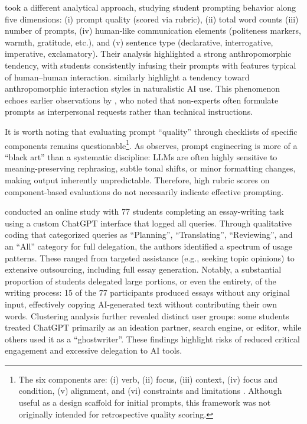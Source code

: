 \documentclass[english]{textolivre}
\begin{document}
\textcite{KNOTH2024100225} took a different analytical approach, studying student prompting behavior along five dimensions: (i) prompt quality (scored via rubric), (ii) total word counts (iii) number of prompts, (iv) human-like communication elements (politeness markers, warmth, gratitude, etc.), and (v) sentence type (declarative, interrogative, imperative, exclamatory). Their analysis highlighted a strong anthropomorphic tendency, with students consistently infusing their prompts with features typical of human--human interaction. \textcite{ammari2026studentsreallyusechatgpt} similarly highlight a tendency toward anthropomorphic interaction styles in naturalistic AI use. This phenomenon echoes earlier observations by \textcite{zamfirescu2023johnny}, who noted that non-experts often formulate prompts as interpersonal requests rather than technical instructions.

It is worth noting that evaluating prompt ``quality'' through checklists of specific components remains questionable\footnote{The six components are: (i) verb, (ii) focus, (iii) context, (iv) focus and condition, (v) alignment, and (vi) constraints and limitations \cite{Eager2023}. Although useful as a design scaffold for initial prompts, this framework was not originally intended for retrospective quality scoring.}.
As \textcite{2024schulho} observes, prompt engineering is more of a ``black art'' than a systematic discipline: LLMs are often highly sensitive to meaning-preserving rephrasing, subtle tonal shifts, or minor formatting changes, making output inherently unpredictable. Therefore, high rubric scores on component-based evaluations do not necessarily indicate effective prompting.

\textcite{jelson2025empiricalstudyunderstandstudents} conducted an online study with 77 students completing an essay-writing task using a custom ChatGPT interface that logged all queries. Through qualitative coding that categorized queries as ``Planning'', ``Translating'', ``Reviewing'', and an ``All'' category for full delegation, the authors identified a spectrum of usage patterns. These ranged from targeted assistance (e.g., seeking topic opinions) to extensive outsourcing, including full essay generation. Notably, a substantial proportion of students delegated large portions, or even the entirety, of the writing process: 15 of the 77 participants produced essays without any original input, effectively copying AI-generated text without contributing their own words. Clustering analysis further revealed distinct user groups: some students treated ChatGPT primarily as an ideation partner, search engine, or editor, while others used it as a ``ghostwriter''. These findings highlight risks of reduced critical engagement and excessive delegation to AI tools.
\end{document}
